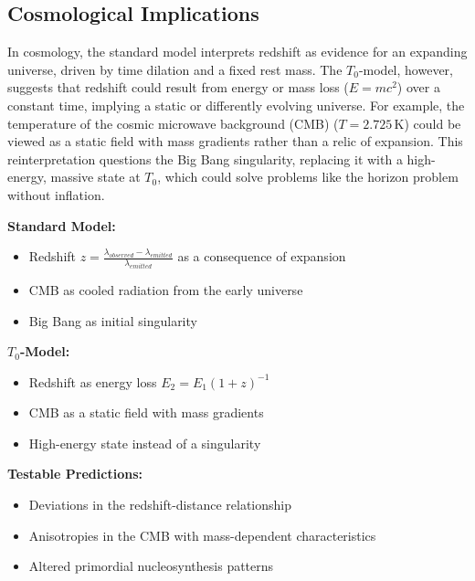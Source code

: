 \documentclass[a4paper,12pt]{article}
\begin{document}
	\subsection{Cosmological Implications}
	In cosmology, the standard model interprets redshift as evidence for an expanding universe, driven by time dilation and a fixed rest mass. The \( T_0 \)-model, however, suggests that redshift could result from energy or mass loss (\( E = m c^2 \)) over a constant time, implying a static or differently evolving universe. For example, the temperature of the cosmic microwave background (CMB) (\( T = 2.725 \, \text{K} \)) could be viewed as a static field with mass gradients rather than a relic of expansion. This reinterpretation questions the Big Bang singularity, replacing it with a high-energy, massive state at \( T_0 \), which could solve problems like the horizon problem without inflation.
	\begin{tcolorbox}[colback=green!5!white,colframe=green!75!black,title=Reinterpretation of Cosmological Phenomena]
		\textbf{Standard Model:}
		\begin{itemize}
			\item Redshift $z = \frac{\lambda_{observed} - \lambda_{emitted}}{\lambda_{emitted}}$ as a consequence of expansion
			\item CMB as cooled radiation from the early universe
			\item Big Bang as initial singularity
		\end{itemize}
		
		\textbf{$T_0$-Model:}
		\begin{itemize}
			\item Redshift as energy loss $E_2 = E_1(1+z)^{-1}$
			\item CMB as a static field with mass gradients
			\item High-energy state instead of a singularity
		\end{itemize}
		
		\textbf{Testable Predictions:}
		\begin{itemize}
			\item Deviations in the redshift-distance relationship
			\item Anisotropies in the CMB with mass-dependent characteristics
			\item Altered primordial nucleosynthesis patterns
		\end{itemize}
	\end{tcolorbox}
	
\end{document}
